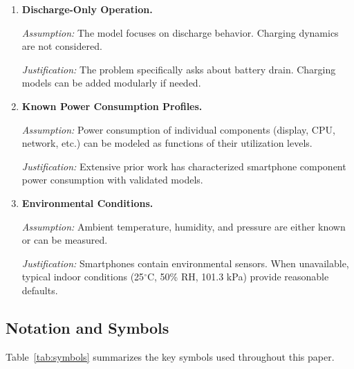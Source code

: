 \begin{enumerate}[label=\textbf{A\arabic*:}]
    \textit{Justification:} Modern Li-ion cells exhibit $\eta > 99.5\%$ \cite{Plett2015}. Losses primarily occur during charging; for discharge modeling, $\eta \approx 1$ is acceptable.
    
    \item \textbf{Discharge-Only Operation.}
    
    \textit{Assumption:} The model focuses on discharge behavior. Charging dynamics are not considered.
    
    \textit{Justification:} The problem specifically asks about battery drain. Charging models can be added modularly if needed.
    
    \item \textbf{Known Power Consumption Profiles.}
    
    \textit{Assumption:} Power consumption of individual components (display, CPU, network, etc.) can be modeled as functions of their utilization levels.
    
    \textit{Justification:} Extensive prior work \cite{Pathak2012, Carroll2010} has characterized smartphone component power consumption with validated models.
    
    \item \textbf{Environmental Conditions.}
    
    \textit{Assumption:} Ambient temperature, humidity, and pressure are either known or can be measured.
    
    \textit{Justification:} Smartphones contain environmental sensors. When unavailable, typical indoor conditions (25$^\circ$C, 50\% RH, 101.3 kPa) provide reasonable defaults.
\end{enumerate}

\subsection{Notation and Symbols}
\label{subsec:notation}

Table~\ref{tab:symbols} summarizes the key symbols used throughout this paper.


